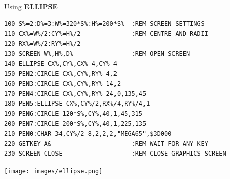 \begin{description}[leftmargin=2cm,style=nextline]
\item [Example:] Using {\bf ELLIPSE}

\begin{tcolorbox}[colback=black,coltext=white]
\verbatimfont{\codefont}
\begin{verbatim}
100 S%=2:D%=3:W%=320*S%:H%=200*S%  :REM SCREEN SETTINGS
110 CX%=W%/2:CY%=H%/2              :REM CENTRE AND RADII
120 RX%=W%/2:RY%=H%/2
130 SCREEN W%,H%,D%                :REM OPEN SCREEN
140 ELLIPSE CX%,CY%,CX%-4,CY%-4
150 PEN2:CIRCLE CX%,CY%,RY%-4,2
160 PEN3:CIRCLE CX%,CY%,RY%-14,2
170 PEN4:CIRCLE CX%,CY%,RY%-24,0,135,45
180 PEN5:ELLIPSE CX%,CY%/2,RX%/4,RY%/4,1
190 PEN6:CIRCLE 120*S%,CY%,40,1,45,315
200 PEN7:CIRCLE 200*S%,CY%,40,1,225,135
210 PEN0:CHAR 34,CY%/2-8,2,2,2,"MEGA65",$3D000
220 GETKEY A&                      :REM WAIT FOR ANY KEY
230 SCREEN CLOSE                   :REM CLOSE GRAPHICS SCREEN
\end{verbatim}
\end{tcolorbox}

\item \begin{center}\texttt{[image: images/ellipse.png]}\end{center}

\end{description}


\newpage
